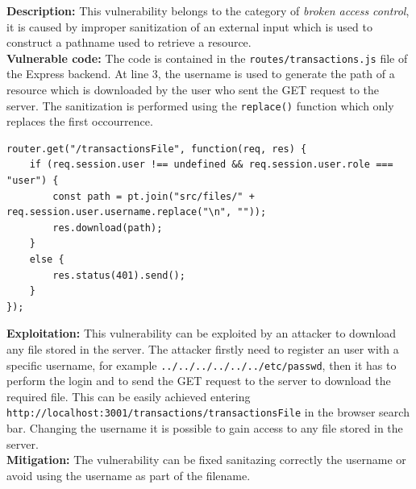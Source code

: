\documentclass[]{article}
\begin{document}
\textbf{Description:} This vulnerability belongs to the category of {\it broken access control}, it is caused by improper sanitization of an external 
input which is used to construct a pathname used to retrieve a resource.
\\ 
\textbf{Vulnerable code:} The code is contained in the \texttt{routes/transactions.js} file of the Express backend. At line 3, the username is used to generate the 
path of a resource which is downloaded by the user who sent the GET request to the server. The sanitization is performed using the \texttt{replace()} function 
which only replaces the first occourrence.
\begin{lstlisting}
router.get("/transactionsFile", function(req, res) {
    if (req.session.user !== undefined && req.session.user.role === "user") {
        const path = pt.join("src/files/" + req.session.user.username.replace("\n", ""));
        res.download(path);
    }
    else {
        res.status(401).send();
    } 
});    
\end{lstlisting}
\textbf{Exploitation:} This vulnerability can be exploited by an attacker to download any file stored in the server. The attacker firstly need to register
an user with a specific username, for example \texttt{../../../../../../etc/passwd}, then it has to perform the login and to send the GET request to the 
server to download the required file. This can be easily achieved entering \texttt{http://localhost:3001/transactions/transactionsFile} in the browser search bar. 
Changing the username it is possible to gain access to any file stored in the server. 
\\
\textbf{Mitigation:} The vulnerability can be fixed sanitazing correctly the username or avoid using the username as part of the filename.
\end{document}
